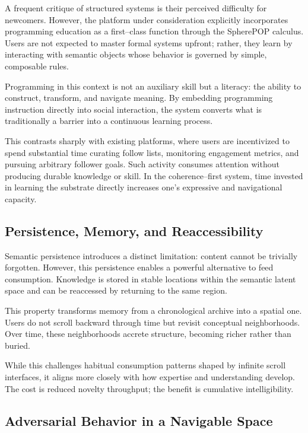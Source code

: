 \documentclass[11pt]{article}
\begin{document}
A frequent critique of structured systems is their perceived difficulty for newcomers.
However, the platform under consideration explicitly incorporates programming education as
a first--class function through the SpherePOP calculus. Users are not expected to master
formal systems upfront; rather, they learn by interacting with semantic objects whose
behavior is governed by simple, composable rules.

Programming in this context is not an auxiliary skill but a literacy: the ability to
construct, transform, and navigate meaning. By embedding programming instruction directly
into social interaction, the system converts what is traditionally a barrier into a
continuous learning process.

This contrasts sharply with existing platforms, where users are incentivized to spend
substantial time curating follow lists, monitoring engagement metrics, and pursuing
arbitrary follower goals. Such activity consumes attention without producing durable
knowledge or skill. In the coherence--first system, time invested in learning the substrate
directly increases one’s expressive and navigational capacity.

\subsection{Persistence, Memory, and Reaccessibility}

Semantic persistence introduces a distinct limitation: content cannot be trivially
forgotten. However, this persistence enables a powerful alternative to feed consumption.
Knowledge is stored in stable locations within the semantic latent space and can be
reaccessed by returning to the same region.

This property transforms memory from a chronological archive into a spatial one. Users do
not scroll backward through time but revisit conceptual neighborhoods. Over time, these
neighborhoods accrete structure, becoming richer rather than buried.

While this challenges habitual consumption patterns shaped by infinite scroll interfaces,
it aligns more closely with how expertise and understanding develop. The cost is reduced
novelty throughput; the benefit is cumulative intelligibility.

\subsection{Adversarial Behavior in a Navigable Space}
\end{document}
